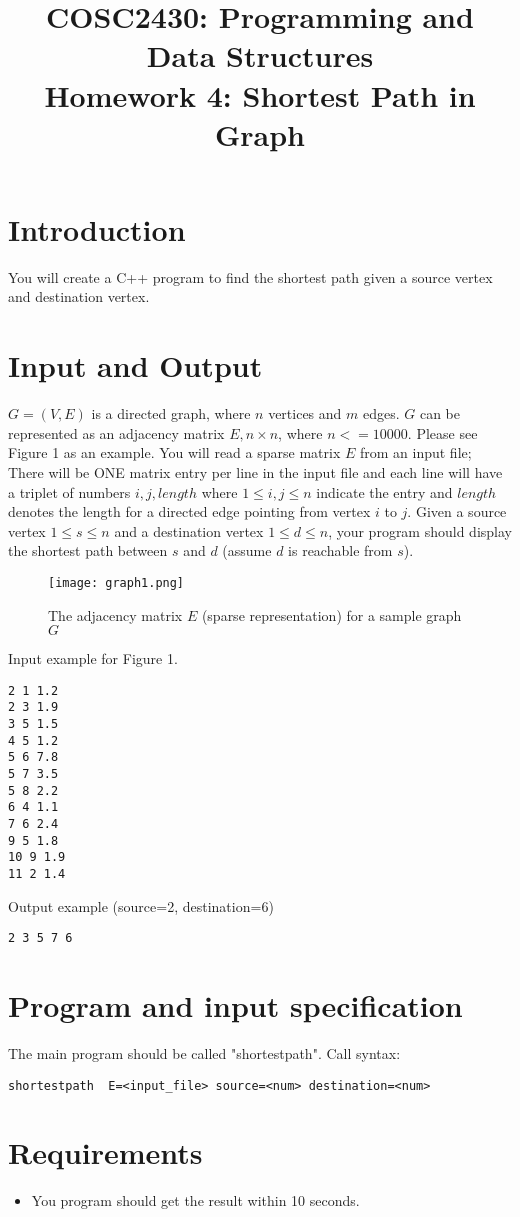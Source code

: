 \documentclass[times,11pt,verbatim,js-singlespace]{article}  %
\title{COSC2430: Programming and Data Structures\\
Homework 4: Shortest Path in Graph
}
\date{}
\begin{document}

\pagestyle{plain}
\let\thepage\relax  %

\maketitle

\section{Introduction}
You will create a C++ program to find the shortest path given a source vertex and destination vertex. 
\section{Input and Output}
$G = (V, E)$ is a directed graph, where $n$ vertices and $m$ edges. $G$ can be represented as an adjacency matrix $E, n\times n$, where $n <= 10000$. Please see Figure 1 as an example. You will read a sparse matrix $E$ from an input file; There will be ONE matrix entry per line in the input file and each line will have a triplet of numbers $i,j,length$ where $1 \le i,j \le n$ indicate the entry and $length$ denotes the length for a directed edge pointing from vertex $i$ to $j$. Given a source vertex $1 \le s \le n$ and a destination vertex $1 \le d \le n$, your program should display the shortest path between $s$ and $d$ (assume $d$ is reachable from $s$). 
\begin{figure}[htbp]
\centering\texttt{[image: graph1.png]}
\label{F:GraphAndE}
\caption{The adjacency matrix $E$  (sparse representation) for a sample graph $G$}
\end{figure}

Input example for Figure 1.
\begin{verbatim}
2 1 1.2
2 3 1.9
3 5 1.5
4 5 1.2
5 6 7.8
5 7 3.5
5 8 2.2
6 4 1.1
7 6 2.4
9 5 1.8
10 9 1.9
11 2 1.4
\end{verbatim}

Output example (source=2, destination=6)
\begin{verbatim}
2 3 5 7 6
\end{verbatim}

\section{Program and input specification}

The main program should be called "shortestpath".
Call syntax:
\begin{verbatim}
shortestpath  E=<input_file> source=<num> destination=<num>
\end{verbatim}

\section{Requirements}
\begin{itemize}
\item You program should get the result within 10 seconds.
\end{itemize}
\end{document}
